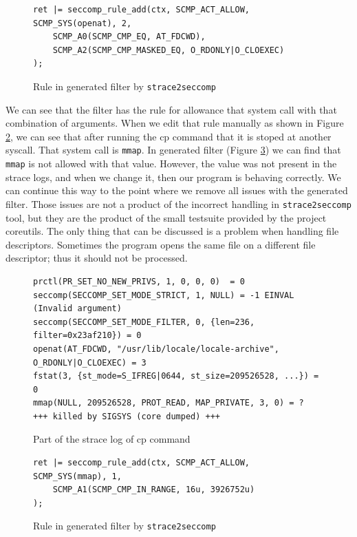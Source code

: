 \begin{figure}[h]
	\lstset{style=c++}
\begin{lstlisting}
ret |= seccomp_rule_add(ctx, SCMP_ACT_ALLOW, SCMP_SYS(openat), 2,
    SCMP_A0(SCMP_CMP_EQ, AT_FDCWD),
    SCMP_A2(SCMP_CMP_MASKED_EQ, O_RDONLY|O_CLOEXEC)
);
\end{lstlisting}
	\caption{Rule in generated filter by \texttt{strace2seccomp}}
	\label{cp_seccomp_rule}
\end{figure}


We can see that the filter has the rule for allowance that system call with that
combination of arguments. When we edit that rule manually as shown in Figure
\ref{cp_strace_error_2}, we can see that after running the cp command that it is
stoped at another syscall. That system call is \texttt{mmap}. In generated
filter (Figure \ref{cp_seccomp_rule_edit_1}) we can find that \texttt{mmap} is
not allowed with that value. However, the value was not present in the strace
logs, and when we change it, then our program is behaving correctly. We can
continue this way to the point where we remove all issues with the generated
filter. Those issues are not a product of the incorrect handling in
\texttt{strace2seccomp} tool, but they are the product of the small testsuite
provided by the project coreutils. The only thing that can be discussed is a
problem when handling file descriptors. Sometimes the program opens the same
file on a different file descriptor; thus it should not be processed.

\begin{figure}[h]
	\lstset{style=npl}
\begin{lstlisting}
prctl(PR_SET_NO_NEW_PRIVS, 1, 0, 0, 0)  = 0
seccomp(SECCOMP_SET_MODE_STRICT, 1, NULL) = -1 EINVAL (Invalid argument)
seccomp(SECCOMP_SET_MODE_FILTER, 0, {len=236, filter=0x23af210}) = 0
openat(AT_FDCWD, "/usr/lib/locale/locale-archive", O_RDONLY|O_CLOEXEC) = 3
fstat(3, {st_mode=S_IFREG|0644, st_size=209526528, ...}) = 0
mmap(NULL, 209526528, PROT_READ, MAP_PRIVATE, 3, 0) = ?
+++ killed by SIGSYS (core dumped) +++
\end{lstlisting}
	\caption{Part of the strace log of cp command}
	\label{cp_strace_error_2}
\end{figure}

\begin{figure}[h]
	\lstset{style=c++}
\begin{lstlisting}
ret |= seccomp_rule_add(ctx, SCMP_ACT_ALLOW, SCMP_SYS(mmap), 1,
    SCMP_A1(SCMP_CMP_IN_RANGE, 16u, 3926752u)
);
\end{lstlisting}
	\caption{Rule in generated filter by \texttt{strace2seccomp}}
	\label{cp_seccomp_rule_edit_1}
\end{figure}

